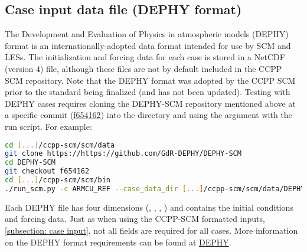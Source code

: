 \subsection{Case input data file (DEPHY format)}
\label{subsection: case input dephy}
The Development and Evaluation of Physics in atmospheric models (DEPHY) format is an internationally-adopted data format intended for use by SCM and LESs. The initialization and forcing data for each case is stored in a NetCDF (version 4) file, although these files are not by default included in the CCPP SCM repository. Note that the DEPHY format was adopted by the CCPP SCM prior to the standard being finalized (and has not been updated). Testing with DEPHY cases requires cloning the DEPHY-SCM repository mentioned above at a specific commit (\href{https://github.com/GdR-DEPHY/DEPHY-SCM/tree/f654162054f19f1fb6475f79c985b1a07cdffe4c}{f654162}) into the  directory and using the  argument with the run script. For example:
\begin{lstlisting}[language=bash]
cd [...]/ccpp-scm/scm/data
git clone https://https://github.com/GdR-DEPHY/DEPHY-SCM
cd DEPHY-SCM
git checkout f654162
cd [...]/ccpp-scm/scm/bin
./run_scm.py -c ARMCU_REF --case_data_dir [...]/ccpp-scm/scm/data/DEPHY-SCM/ARMCU/REF -v
\end{lstlisting}
Each DEPHY file has four dimensions (, , , ) and contains the initial conditions and forcing data. Just as when using the CCPP-SCM formatted inputs, \ref{subsection: case input}, not all fields are required for all cases. More information on the DEPHY format requirements can be found at \href{https://github.com/GdR-DEPHY/DEPHY-SCM}{DEPHY}. 



